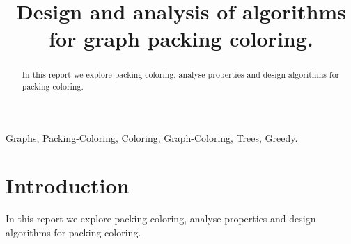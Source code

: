 \documentclass[]{interact}
\begin{document}

\title{Design and analysis of algorithms for graph packing coloring.}

\author{
}

\maketitle

\begin{abstract}
In this report we explore packing coloring, analyse properties and design algorithms for packing coloring.
\end{abstract}

\begin{keywords}
Graphs, Packing-Coloring, Coloring, Graph-Coloring, Trees, Greedy.
\end{keywords}

\section{Introduction}
In this report we explore packing coloring, analyse properties and design algorithms for packing coloring.
\end{document}
